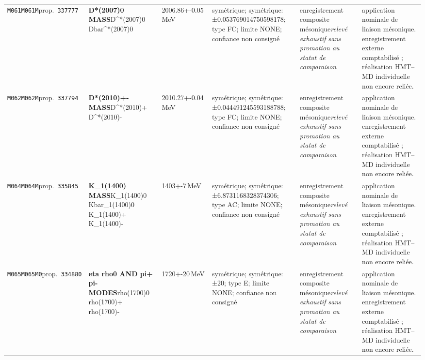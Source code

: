 \begin{landscape}
\begin{longtable}{L{1.85cm}L{4.45cm}L{2.35cm}L{4.05cm}L{3.35cm}L{7.15cm}}
\texttt{M061}\newline \texttt{M061M}\newline prop.\ \texttt{337777} & \textbf{D*(2007)0 MASS}\newline D\textasciicircum{}*(2007)0 \textbar{}\allowbreak{} Dbar\textasciicircum{}*(2007)0 & 2006.86+-0.05\,MeV & symétrique; symétrique: ±0.053769014750598178; type FC; limite NONE; confiance non consigné & enregistrement composite mésonique\newline \emph{relevé exhaustif sans promotion au statut de comparaison} & application nominale de liaison mésonique. enregistrement externe comptabilisé ; réalisation HMT--MD individuelle non encore reliée. \\
\texttt{M062}\newline \texttt{M062M}\newline prop.\ \texttt{337794} & \textbf{D*(2010)+- MASS}\newline D\textasciicircum{}*(2010)+ \textbar{}\allowbreak{} D\textasciicircum{}*(2010)- & 2010.27+-0.04\,MeV & symétrique; symétrique: ±0.044491245593188788; type FC; limite NONE; confiance non consigné & enregistrement composite mésonique\newline \emph{relevé exhaustif sans promotion au statut de comparaison} & application nominale de liaison mésonique. enregistrement externe comptabilisé ; réalisation HMT--MD individuelle non encore reliée. \\
\texttt{M064}\newline \texttt{M064M}\newline prop.\ \texttt{335845} & \textbf{K\_\allowbreak{}1(1400) MASS}\newline K\_\allowbreak{}1(1400)0 \textbar{}\allowbreak{} Kbar\_\allowbreak{}1(1400)0 \textbar{}\allowbreak{} K\_\allowbreak{}1(1400)+ \textbar{}\allowbreak{} K\_\allowbreak{}1(1400)- & 1403+-7\,MeV & symétrique; symétrique: ±6.8731168328374306; type AC; limite NONE; confiance non consigné & enregistrement composite mésonique\newline \emph{relevé exhaustif sans promotion au statut de comparaison} & application nominale de liaison mésonique. enregistrement externe comptabilisé ; réalisation HMT--MD individuelle non encore reliée. \\
\texttt{M065}\newline \texttt{M065M0}\newline prop.\ \texttt{334880} & \textbf{eta rho0 AND pi+ pi- MODES}\newline rho(1700)0 \textbar{}\allowbreak{} rho(1700)+ \textbar{}\allowbreak{} rho(1700)- & 1720+-20\,MeV & symétrique; symétrique: ±20; type E; limite NONE; confiance non consigné & enregistrement composite mésonique\newline \emph{relevé exhaustif sans promotion au statut de comparaison} & application nominale de liaison mésonique. enregistrement externe comptabilisé ; réalisation HMT--MD individuelle non encore reliée. \\

\end{longtable}
\end{landscape}
